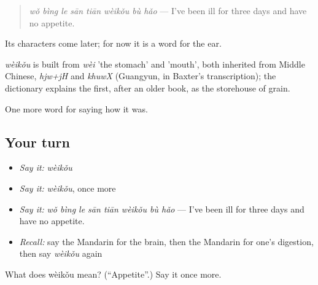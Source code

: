 \begin{quote}
\emph{wǒ bìng le sān tiān wèikǒu bù hǎo} — I've been ill for three days and have no appetite.
\end{quote}

Its characters come later; for now it is a word for the ear.

\begin{cousinweb}
\emph{wèikǒu} is built from \emph{wèi} 'the stomach' and  'mouth', both inherited from Middle Chinese, \emph{hjw+jH} and \emph{khuwX} (Guangyun, in Baxter's transcription); the dictionary explains the first, after an older book, as the storehouse of grain.
\end{cousinweb}

\begin{grammarlens}[title={What you've built}]
One more word for saying how it was.
\end{grammarlens}

\subsection*{Your turn}
\begin{itemize}
\raggedright
  \item \emph{Say it:} \emph{wèikǒu}
  \item \emph{Say it:} \emph{wèikǒu}, once more
  \item \emph{Say it:} \emph{wǒ bìng le sān tiān wèikǒu bù hǎo} — I've been ill for three days and have no appetite.
  \item \emph{Recall:} say the Mandarin for the brain, then the Mandarin for one's digestion, then say \emph{wèikǒu} again
\end{itemize}

\begin{tcolorbox}[breakable,colback=teal!4,colframe=teal!35!black,title={Before you move on}]
What does wèikǒu mean? (\textquotedblleft{}Appetite\textquotedblright{}.) Say it once more.
\end{tcolorbox}
